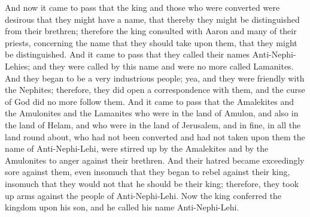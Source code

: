 And now it came to pass that the king and those who were converted were desirous that they might have a name, that thereby they might be distinguished from their brethren; therefore the king consulted with Aaron and many of their priests, concerning the name that they should take upon them, that they might be distinguished.
\bverse \iffalse And it came to pass that they called their names Anti-Nephi-Lehies; and they were called by this name and were no more called Lamanites. \fi
And it came to pass that they called their names Anti-Nephi-Lehies; and they were called by this name and were no more called Lamanites.
\bverse \iffalse And they began to be a very industrious people; yea, and they were friendly with the Nephites; therefore, they did open a correspondence with them, and the curse of God did no more follow them. \fi
And they began to be a very industrious people; yea, and they were friendly with the Nephites; therefore, they did open a correspondence with them, and the curse of God did no more follow them.
\bchapter
\bverse \iffalse And it came to pass that the Amalekites and the Amulonites and the Lamanites who were in the land of Amulon, and also in the land of Helam, and who were in the land of Jerusalem, and in fine, in all the land round about, who had not been converted and had not taken upon them the name of Anti-Nephi-Lehi, were stirred up by the Amalekites and by the Amulonites to anger against their brethren. \fi
And it came to pass that the Amalekites and the Amulonites and the Lamanites who were in the land of Amulon, and also in the land of Helam, and who were in the land of Jerusalem, and in fine, in all the land round about, who had not been converted and had not taken upon them the name of Anti-Nephi-Lehi, were stirred up by the Amalekites and by the Amulonites to anger against their brethren.
\bverse \iffalse And their hatred became exceedingly sore against them, even insomuch that they began to rebel against their king, insomuch that they would not that he should be their king; therefore, they took up arms against the people of Anti-Nephi-Lehi. \fi
And their hatred became exceedingly sore against them, even insomuch that they began to rebel against their king, insomuch that they would not that he should be their king; therefore, they took up arms against the people of Anti-Nephi-Lehi.
\bverse \iffalse Now the king conferred the kingdom upon his son, and he called his name Anti-Nephi-Lehi. \fi
Now the king conferred the kingdom upon his son, and he called his name Anti-Nephi-Lehi.
